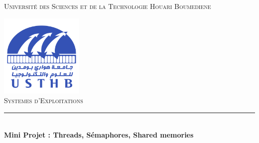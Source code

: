 
\begin{titlepage} %
	\newcommand{\HRule}{\rule{\linewidth}{0.5mm}} %

	\center %


	\baselineskip
	\textsc{\LARGE Université des Sciences et de la Technologie Houari Boumediene}%


	\vfill
	\includegraphics[width=0.3\textwidth]{USTHB_Logo.png}\\[1cm] %


	\textsc{\Large Systemes d'Exploitations}\\[0.5cm] %


	\HRule\\[0.4cm]
	\baselineskip
	{\huge\bfseries Mini Projet : Threads, Sémaphores, Shared memories}\\[0.4cm] %


\end{titlepage}
